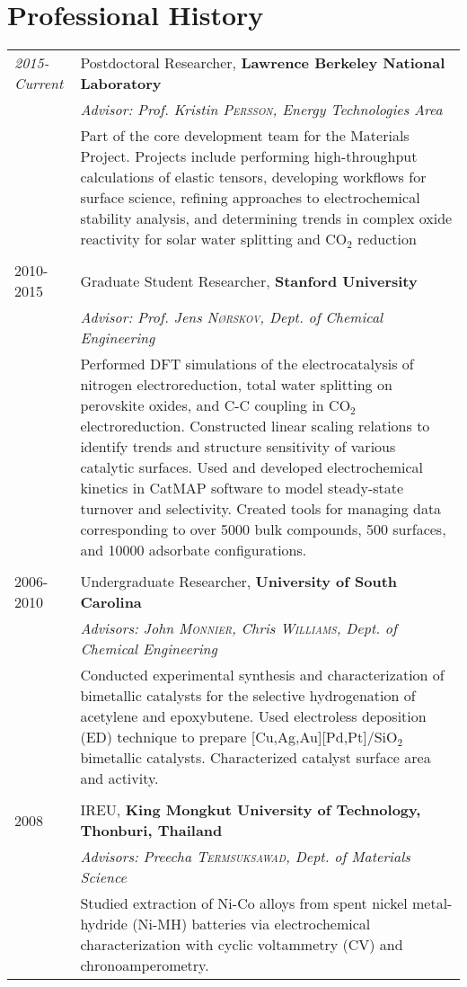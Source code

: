 \documentclass[a4paper,10pt]{article}
\begin{document}
\section{Professional History}
\begin{tabular}{l|p{11cm}}
 \emph{2015-Current} & Postdoctoral Researcher, \textbf{Lawrence Berkeley National Laboratory} \\
 &\emph{Advisor: Prof. Kristin \textsc{Persson}, Energy Technologies Area}\\& \smallskip
 \small{Part of the core development team for the Materials Project.  Projects include performing 
 high-throughput calculations of elastic tensors, developing workflows for surface science, refining approaches 
 to electrochemical stability analysis, and determining trends in complex oxide reactivity for solar water splitting
 and CO$_2$ reduction}\\\multicolumn{2}{c}{} \\
 \textsc{2010-2015} & Graduate Student Researcher, \textbf{Stanford University}\\&\emph{Advisor: Prof. Jens \textsc{N\o rskov}, Dept. of Chemical Engineering}\\&\small{Performed DFT simulations of the electrocatalysis of nitrogen electroreduction, total water splitting on perovskite oxides, and C-C coupling in CO$_2$ electroreduction.  Constructed linear scaling relations to identify trends and structure sensitivity of various catalytic surfaces.  Used and developed electrochemical kinetics in CatMAP software to model steady-state turnover and selectivity.  Created tools for managing data corresponding to over 5000 bulk compounds, 500 surfaces, and 10000 adsorbate configurations.}\\\multicolumn{2}{c}{} \\
\textsc{2006-2010} & Undergraduate Researcher, \textbf{University of South Carolina}\\&\emph{Advisors: John \textsc{Monnier}, Chris \textsc{Williams}, Dept. of Chemical Engineering}\\&\small{Conducted experimental synthesis and characterization of bimetallic catalysts for the selective hydrogenation of acetylene and epoxybutene.  Used electroless deposition (ED) technique to prepare [Cu,Ag,Au][Pd,Pt]/SiO$_2$ bimetallic catalysts.  Characterized catalyst surface area and activity.}\\ \multicolumn{2}{c}{} \\
\textsc{2008} & IREU, \textbf{King Mongkut University of Technology, Thonburi, Thailand}\\&\emph{Advisors: Preecha \textsc{Termsuksawad}, Dept. of Materials Science}\\&\small{Studied extraction of Ni-Co alloys from spent nickel metal-hydride (Ni-MH) batteries via electrochemical characterization with cyclic voltammetry (CV) and chronoamperometry.}
\end{tabular}
\vspace{0.2in}
\end{document}
